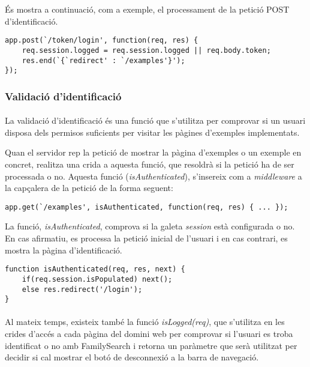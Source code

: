     És mostra a continuació, com a exemple, el processament de la petició POST d'identificació.

    \begin{lstlisting}[style=rawOwn,caption={Resposta a la petició AJAX d'identificació}]
app.post(`/token/login', function(req, res) {
    req.session.logged = req.session.logged || req.body.token;
    res.end(`{`redirect' : `/examples'}');
});
    \end{lstlisting}


    \subsubsection{Validació d'identificació}

    \paragraph{}
    La validació d'identificació és una funció que s'utilitza per comprovar si un usuari disposa dels permisos suficients per visitar les pàgines d'exemples implementats.

    Quan el servidor rep la petició de mostrar la pàgina d'exemples o un exemple en concret, realitza una crida a aquesta funció, que resoldrà si la petició ha de ser processada o no. Aquesta funció (\emph{isAuthenticated}), s'insereix com a \emph{middleware} a la capçalera de la petició de la forma seguent:

    \begin{lstlisting}[style=rawOwn,caption={Inserció de \emph{middleware} en una petició del client}]
app.get(`/examples', isAuthenticated, function(req, res) { ... });
    \end{lstlisting}

    La funció, \emph{isAuthenticated}, comprova si la galeta \emph{session} està configurada o no. En cas afirmatiu, es processa la petició inicial de l'usuari i en cas contrari, es mostra la pàgina d'identificació.

    \begin{lstlisting}[style=rawOwn,caption={Comprovació de la galeta \emph{session}}]
function isAuthenticated(req, res, next) {
    if(req.session.isPopulated) next();
    else res.redirect('/login');
}
    \end{lstlisting}

    \paragraph{}
    Al mateix temps, existeix també la funció \emph{isLogged(req)}, que s’utilitza en les crides d’accés a cada pàgina del domini web per comprovar si l’usuari es troba identificat o no amb FamilySearch i retorna un paràmetre que serà utilitzat per decidir si cal mostrar el botó de desconnexió a la barra de navegació.

